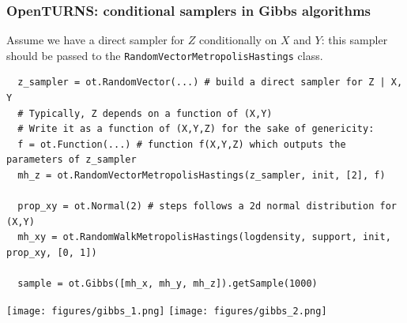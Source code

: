 \documentclass{beamer}
\begin{document}

\begin{frame}[containsverbatim]
\frametitle{OpenTURNS: conditional samplers in Gibbs algorithms}
\small
Assume we have a direct sampler for $Z$ conditionally on $X$ and $Y$:
this sampler should be passed to the \texttt{RandomVectorMetropolisHastings} class.

\begin{lstlisting}
  z_sampler = ot.RandomVector(...) # build a direct sampler for Z | X, Y
  # Typically, Z depends on a function of (X,Y)
  # Write it as a function of (X,Y,Z) for the sake of genericity:
  f = ot.Function(...) # function f(X,Y,Z) which outputs the parameters of z_sampler
  mh_z = ot.RandomVectorMetropolisHastings(z_sampler, init, [2], f)

  prop_xy = ot.Normal(2) # steps follows a 2d normal distribution for (X,Y)
  mh_xy = ot.RandomWalkMetropolisHastings(logdensity, support, init, prop_xy, [0, 1])

  sample = ot.Gibbs([mh_x, mh_y, mh_z]).getSample(1000)
\end{lstlisting}
\centering
\texttt{[image: figures/gibbs\_1.png]}
\texttt{[image: figures/gibbs\_2.png]}

\end{frame}

\end{document}
